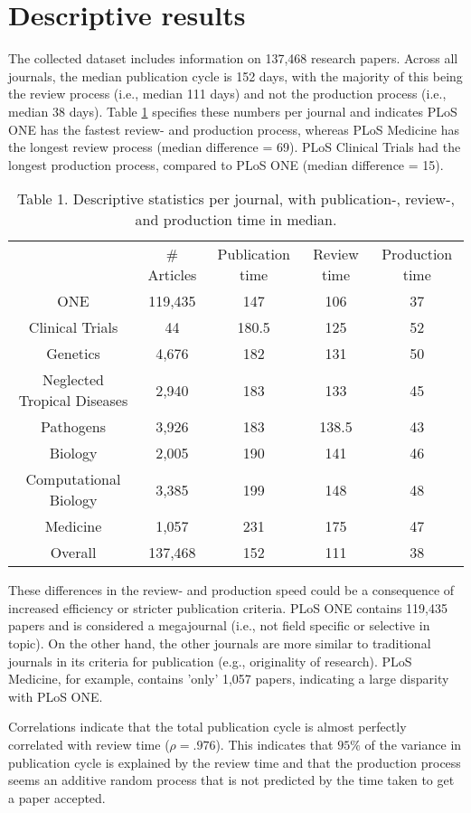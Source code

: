 \section*{Descriptive results}
The collected dataset includes information on 137,468 research papers. Across all journals, the median publication cycle is 152 days, with the majority of this being the review process (i.e., median 111 days) and not the production process (i.e., median 38 days). Table \ref{tab:tab1} specifies these numbers per journal and indicates PLoS ONE has the fastest review- and production process, whereas PLoS Medicine has the longest review process (median difference = 69). PLoS Clinical Trials had the longest production process, compared to PLoS ONE (median difference = 15).

\begin{table}
\caption{Table 1. Descriptive statistics per journal, with publication-, review-, and production time in median.}
\label{tab:tab1}
\begin{tabular}{ c c c c c }
          & \# Articles & Publication time & Review time & Production time \\
    ONE   & 119,435 & 147   & 106   & 37 \\
    Clinical Trials & 44    & 180.5 & 125   & 52 \\
    Genetics & 4,676  & 182   & 131   & 50 \\
    Neglected Tropical Diseases & 2,940  & 183   & 133   & 45 \\
    Pathogens & 3,926  & 183   & 138.5 & 43 \\
    Biology & 2,005  & 190   & 141   & 46 \\
    Computational Biology & 3,385  & 199   & 148   & 48 \\
    Medicine & 1,057  & 231   & 175   & 47 \\
    Overall & 137,468 & 152   & 111   & 38 \\
\end{tabular}
\end{table}

These differences in the review- and production speed could be a consequence of increased efficiency or stricter publication criteria. PLoS ONE contains 119,435 papers and is considered a megajournal (i.e., not field specific or selective in topic). On the other hand, the other journals are more similar to traditional journals in its criteria for publication (e.g., originality of research). PLoS Medicine, for example, contains 'only' 1,057 papers, indicating a large disparity with PLoS ONE. 

Correlations indicate that the total publication cycle is almost perfectly correlated with review time ($\rho=.976$). This indicates that $95\%$ of the variance in publication cycle is explained by the review time and that the production process seems an additive random process that is not predicted by the time taken to get a paper accepted.